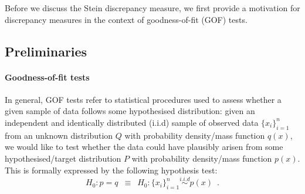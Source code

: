 Before we discuss the Stein discrepancy measure, we first provide a motivation for discrepancy measures in the context of goodness-of-fit (GOF) tests.





\subsection{Preliminaries}

\paragraph*{Goodness-of-fit tests}

In general, GOF tests refer to statistical procedures used to assess whether a given sample of data follows some hypothesised distribution: given an independent and identically distributed (i.i.d) sample of observed data $\{x_i\}_{i=1}^n$ from an unknown distribution $Q$ with probability density/mass function $q(x)$, we would like to test whether the data could have plausibly arisen from some hypothesised/target distribution $P$ with probability density/mass function $p(x)$. This is formally expressed by the following hypothesis test:
\renewcommand{\theequation}{2.6}
\begin{equation}
\label{eqn:gof_test}
H_0: p = q \enspace \equiv \enspace H_0: \{x_i\}_{i=1}^n \overset{i.i.d}{\sim} p(x) \enspace.
\end{equation}

